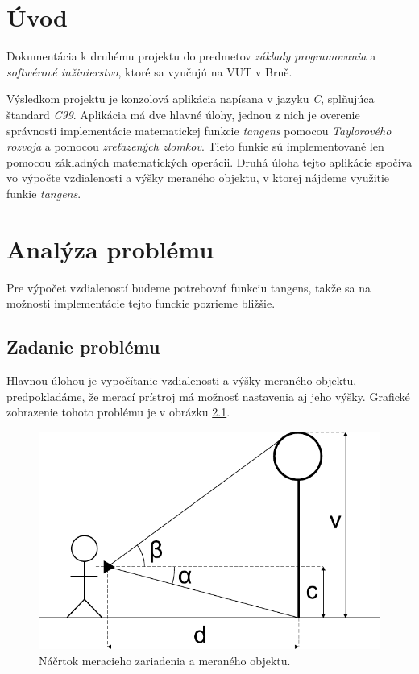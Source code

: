 \documentclass[12pt,a4paper,titlepage,final]{report}
\begin{document}


\pagestyle{plain}
\setcounter{page}{1}
\tableofcontents

\newpage
\pagestyle{plain}
\setcounter{page}{1}

\chapter{Úvod} \label{uvod}
Dokumentácia k druhému projektu do predmetov \textit{základy programovania} a \textit{softwérové inžinierstvo}, ktoré sa vyučujú na VUT v Brně.

Výsledkom projektu je konzolová aplikácia napísana v jazyku \textit{C}, splňujúca štandard \textit{C99}. Aplikácia má dve hlavné úlohy, jednou z nich je overenie správnosti implementácie matematickej funkcie \textit{tangens} pomocou \textit{Taylorového rozvoja} a pomocou \textit{zreťazených zlomkov}. Tieto funkie sú implementované len pomocou základných matematických operácii. Druhá úloha tejto aplikácie spočíva vo výpočte vzdialenosti a výšky meraného objektu, v ktorej nájdeme využitie funkie \textit{tangens}.


\chapter{Analýza problému} \label{analyza}
Pre výpočet vzdialeností budeme potrebovať funkciu tangens, takže sa na možnosti implementácie tejto funckie pozrieme bližšie.

\section{Zadanie problému}
Hlavnou úlohou je vypočítanie vzdialenosti a výšky meraného objektu, predpokladáme, že merací prístroj má možnosť nastavenia aj jeho výšky. Grafické zobrazenie tohoto problému je v obrázku \ref{fig:pajko}.

\begin{figure}[!h]
  \centering
  \includegraphics[scale=0.75]{img/drawing}
	\caption{Náčrtok meracieho zariadenia a meraného objektu.}
  \label{fig:pajko}
\end{figure}
\end{document}
